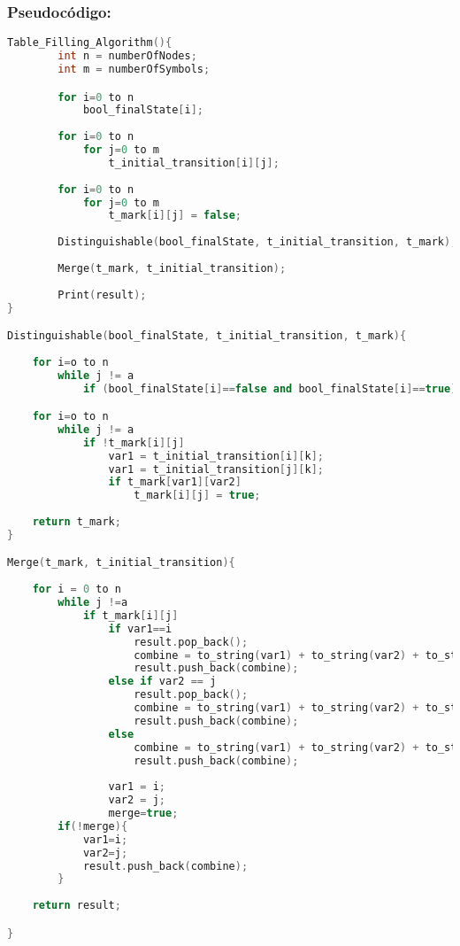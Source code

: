 \documentclass[12pt]{article}
\begin{document}
\newpage
\subsubsection{Pseudoc\'odigo:}
\begin{lstlisting}[language=c++]
Table_Filling_Algorithm(){
        int n = numberOfNodes;
        int m = numberOfSymbols;

        for i=0 to n
            bool_finalState[i];
            
        for i=0 to n
            for j=0 to m
                t_initial_transition[i][j];
                
        for i=0 to n
            for j=0 to m
                t_mark[i][j] = false;
                
        Distinguishable(bool_finalState, t_initial_transition, t_mark);
        
        Merge(t_mark, t_initial_transition);
                
        Print(result);
}

Distinguishable(bool_finalState, t_initial_transition, t_mark){
    
    for i=o to n
        while j != a
            if (bool_finalState[i]==false and bool_finalState[i]==true) or (bool_finalState[i]==true and bool_finalState[i]==false)

    for i=o to n
        while j != a
            if !t_mark[i][j]
                var1 = t_initial_transition[i][k];
                var1 = t_initial_transition[j][k];
                if t_mark[var1][var2]
                    t_mark[i][j] = true;
                    
    return t_mark;
}

Merge(t_mark, t_initial_transition){
    
    for i = 0 to n
        while j !=a
            if t_mark[i][j]
                if var1==i
                    result.pop_back();
                    combine = to_string(var1) + to_string(var2) + to_string(j);
                    result.push_back(combine);
                else if var2 == j
                    result.pop_back();
                    combine = to_string(var1) + to_string(var2) + to_string(j);
                    result.push_back(combine);
                else
                    combine = to_string(var1) + to_string(var2) + to_string(j);
                    result.push_back(combine);
                    
                var1 = i;
                var2 = j;
                merge=true;
        if(!merge){
            var1=i;
            var2=j;
            result.push_back(combine);
        }
    
    return result;

}

\end{lstlisting}
\end{document}
